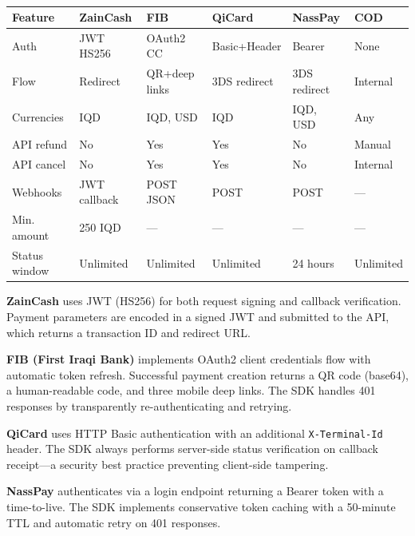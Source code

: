 \documentclass[10pt, a4paper, oneside]{article}
\begin{document}
\begin{table}[ht]
    \centering
    \setlength\tabcolsep{3pt}
    \small
    \begin{tabular}{llllll}
        \toprule
        \bfseries Feature & \bfseries ZainCash & \bfseries FIB & \bfseries QiCard & \bfseries NassPay & \bfseries COD \\
        \midrule
        Auth & JWT HS256 & OAuth2 CC & Basic+Header & Bearer & None \\
        Flow & Redirect & QR+deep links & 3DS redirect & 3DS redirect & Internal \\
        Currencies & IQD & IQD, USD & IQD & IQD, USD & Any \\
        API refund & No & Yes & Yes & No & Manual \\
        API cancel & No & Yes & Yes & No & Internal \\
        Webhooks & JWT callback & POST JSON & POST & POST & --- \\
        Min. amount & 250 IQD & --- & --- & --- & --- \\
        Status window & Unlimited & Unlimited & Unlimited & 24 hours & Unlimited \\
        \bottomrule
    \end{tabular}
    \caption{\fontsize{10pt}{11pt}}
    \label{table:gateway-comparison}
\end{table}

\textbf{ZainCash} uses JWT (HS256) for both request signing and callback verification. Payment parameters are encoded in a signed JWT and submitted to the API, which returns a transaction ID and redirect URL.

\textbf{FIB (First Iraqi Bank)} implements OAuth2 client credentials flow with automatic token refresh. Successful payment creation returns a QR code (base64), a human-readable code, and three mobile deep links. The SDK handles 401 responses by transparently re-authenticating and retrying.

\textbf{QiCard} uses HTTP Basic authentication with an additional \texttt{X-Terminal-Id} header. The SDK always performs server-side status verification on callback receipt---a security best practice preventing client-side tampering.

\textbf{NassPay} authenticates via a login endpoint returning a Bearer token with a time-to-live. The SDK implements conservative token caching with a 50-minute TTL and automatic retry on 401 responses.
\end{document}

